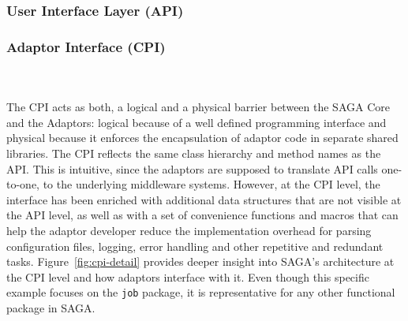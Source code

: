 

  


  \subsubsection{User Interface Layer (API)}
 
 
  \subsubsection{Adaptor Interface (CPI)}
  \\
  \\
  

  The CPI acts as both,
  a logical and a physical barrier between the SAGA Core and the Adaptors:
  logical because of a well defined programming interface and physical because
  it enforces the encapsulation of adaptor code in separate shared libraries.
  The CPI reflects the same class hierarchy and method names as the API. This
  is intuitive, since the adaptors are supposed to translate API calls
  one-to-one, to the underlying middleware systems. However, at the CPI level,
  the interface has been enriched with additional data structures that are not
  visible at the API level, as well as with a set of convenience functions and
  macros that can help the adaptor developer reduce the implementation overhead
  for parsing configuration files, logging, error handling and other repetitive
  and redundant tasks. Figure~\ref{fig:cpi-detail} provides deeper insight into
  SAGA's architecture at the CPI level and how adaptors interface with it. Even
  though this specific example focuses on the \texttt{job} package, it is
  representative for any other functional package in SAGA.
 
